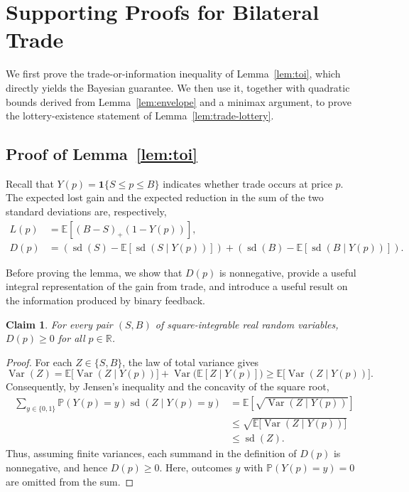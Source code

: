 \documentclass[11pt]{article}
\newtheorem{claim}[theorem]{Claim}
\newcommand{\E}[1]{\mathbb E\left[#1\right]}
\newcommand{\R}{\mathbb R}
\DeclareMathOperator{\sd}{sd}
\begin{document}
\section{Supporting Proofs for Bilateral Trade}\label{sec:trade-proofs}

We first prove the trade-or-information inequality of Lemma~\ref{lem:toi}, which directly yields the Bayesian guarantee. We then use it, together with quadratic bounds derived from Lemma~\ref{lem:envelope} and a minimax argument, to prove the lottery-existence statement of Lemma~\ref{lem:trade-lottery}.

\subsection{Proof of Lemma~\ref{lem:toi}}\label{sec:trade-toi}

Recall that $Y(p)=\mathbf1\{S\le p\le B\}$ indicates whether trade occurs at price $p$. The expected lost gain and the expected reduction in the sum of the two standard deviations are, respectively,
\[
 \begin{aligned}
 L(p)&=\E{(B-S)_+(1-Y(p))},\\
 D(p)&=(\sd(S)-\E{\sd(S\mid Y(p))}) + (\sd(B)-\E{\sd(B\mid Y(p))}).
 \end{aligned}
\]

Before proving the lemma, {we show that} $D(p)$ is {nonnegative}, provide a useful {integral representation of the gain from trade}, and introduce a useful result on the information produced by binary feedback.

\begin{claim}
\label{cl:D_pos}
    For every pair $(S,B)$ of square-integrable real random variables,   $D(p) \ge 0$ for all $p \in \R$.
\end{claim}
\begin{proof}
    For each $Z\in\{S,B\}$, the law of total variance gives
\[
\operatorname{Var}(Z)
=
\mathbb{E}\bigl[\operatorname{Var}(Z\mid Y(p))\bigr]
+
\operatorname{Var}\bigl(\mathbb{E}[Z\mid Y(p)]\bigr)
\ge
\mathbb{E}\bigl[\operatorname{Var}(Z\mid Y(p))\bigr].
\]
Consequently, by Jensen's inequality and the concavity of the
square root,
\[
\begin{aligned}
\sum_{{y \in \{0,1\}}}\mathbb{P}(Y(p)=y)\operatorname{sd}(Z\mid Y(p)=y)
&=
\mathbb{E}\left[\sqrt{\operatorname{Var}(Z\mid Y(p))}\right]\\
&\le
\sqrt{\mathbb{E}\bigl[\operatorname{Var}(Z\mid Y(p))\bigr]}\\
&\le \operatorname{sd}(Z).
\end{aligned}
\]
Thus, assuming finite variances, each summand in the definition
of $D(p)$ is nonnegative, and hence $D(p)\ge 0$.
Here, outcomes $y$ with $\mathbb{P}(Y(p)=y)=0$ are omitted
from the sum.
\end{proof}
\end{document}
